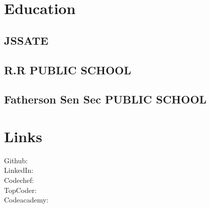 \documentclass[]{deedy-resume-openfont}
\begin{document}
%
%

%
%



%
%

\begin{minipage}[t]{0.33\textwidth} 


\section{Education} 

\subsection{JSSATE}
\sectionsep


\subsection{R.R PUBLIC SCHOOL}
\sectionsep

\subsection{Fatherson Sen Sec PUBLIC SCHOOL}
\sectionsep


\section{Links} 

Github: \href{https://github.com/Deshwal36}{} \\
LinkedIn: \href{https://www.linkedin.com/in/shivam-deshwal-ba9a6bb6/}{} \\
Codechef: \href{https://www.codechef.com/users/deshwal}{} \\
TopCoder: \href{https://www.topcoder.com/members/Deshwal}{} \\
Codeacademy: \href{https://www.codecademy.com/shivam.deshwal36}{} \\


\end{minipage}
\end{document}
